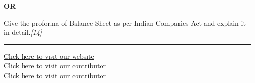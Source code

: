 \documentclass[11pt,a4paper]{article}
\newcommand{\pts}[1]{\hfill   \textit{[#1]}}
\begin{document}
\centerline{   \textbf{OR}}

Give the proforma of Balance Sheet as per Indian Companies Act and explain it in detail.\pts{14}

\vfill
\rule{\linewidth}{0.4pt}

\begin{center}\small
\href{https://bhu-exam.vercel.app/}{Click here to visit our website}\\[4pt]
\href{https://me-aryan.vercel.app/}{Click here to visit our contributor}\\[4pt]
\href{https://quashan-me.vercel.app/}{Click here to visit our contributor}
\end{center}
\end{document}
